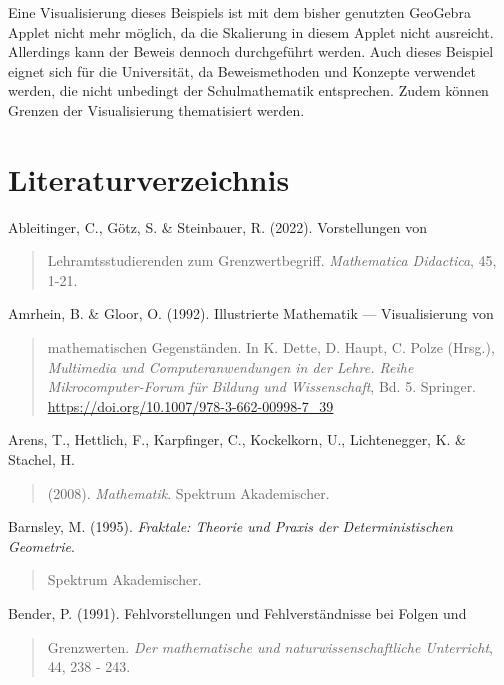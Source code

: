 \documentclass{book}
\begin{document}
Eine Visualisierung dieses Beispiels ist mit dem bisher genutzten
GeoGebra Applet nicht mehr möglich, da die Skalierung in diesem Applet
nicht ausreicht. Allerdings kann der Beweis dennoch durchgeführt werden.
Auch dieses Beispiel eignet sich für die Universität, da Beweismethoden
und Konzepte verwendet werden, die nicht unbedingt der Schulmathematik
entsprechen. Zudem können Grenzen der Visualisierung thematisiert
werden.



\hypertarget{literaturverzeichnis}{%
\section{Literaturverzeichnis}\label{literaturverzeichnis}}

Ableitinger, C., Götz, S. \& Steinbauer, R. (2022). Vorstellungen von

\begin{quote}
Lehramtsstudierenden zum Grenzwertbegriff. \emph{Mathematica Didactica},
45, 1-21.
\end{quote}

Amrhein, B. \& Gloor, O. (1992). Illustrierte Mathematik ---
Visualisierung von

\begin{quote}
mathematischen Gegenständen. In K. Dette, D. Haupt, C. Polze (Hrsg.),
\emph{Multimedia und Computeranwendungen in der Lehre. Reihe
Mikrocomputer-Forum für Bildung und Wissenschaft}, Bd. 5. Springer.
\url{https://doi.org/10.1007/978-3-662-00998-7_39}
\end{quote}

Arens, T., Hettlich, F., Karpfinger, C., Kockelkorn, U., Lichtenegger,
K. \& Stachel, H.

\begin{quote}
(2008). \emph{Mathematik}. Spektrum Akademischer.
\end{quote}

Barnsley, M. (1995). \emph{Fraktale: Theorie und Praxis der
Deterministischen Geometrie}.

\begin{quote}
Spektrum Akademischer.
\end{quote}

Bender, P. (1991). Fehlvorstellungen und Fehlverständnisse bei Folgen
und

\begin{quote}
Grenzwerten. \emph{Der mathematische und naturwissenschaftliche
Unterricht}, 44, 238 - 243.
\end{quote}
\end{document}
